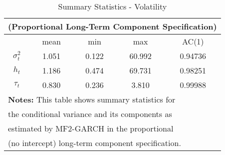 \documentclass{article}
\begin{document}
\pagebreak
\setcounter{table}{4}
\begin{table}
\centering
\caption{Summary Statistics - Volatility}
\begin{tabular}{ccccc}
\multicolumn{5}{c}{(Proportional Long-Term Component Specification)}\\
\midrule
\midrule
\mbox{} & mean & min & max & AC(1)\\
\midrule
\mbox{$\sigma^2_t$}& 1.051 & 0.122 & 60.992 & 0.94736\\
\mbox{$h_t$} & 1.186 & 0.474 & 69.731 & 0.98251\\
\mbox{$\tau_t$} & 0.830 & 0.236 & 3.810 & 0.99988\\
\midrule
\multicolumn{5}{l}{\textbf{Notes:} This table shows summary statistics for}\\
\multicolumn{5}{l}{the conditional variance and its components as}\\
\multicolumn{5}{l}{estimated by MF2-GARCH in the proportional}\\
\multicolumn{5}{l}{(no intercept) long-term component specification.}\\
\midrule
\midrule
\end{tabular}
\end{table}
\end{document}
